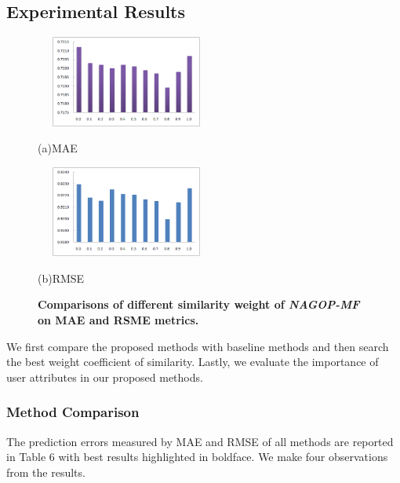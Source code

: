 \documentclass{llncs}
\begin{document}
	\subsection{Experimental Results}
	\begin{figure}
		\centering
		\begin{minipage}{0.48\linewidth}
			\centerline{\includegraphics[height=3cm, width=6cm]{XITAMAE.eps}}
			\centerline{(a)MAE}
		\end{minipage}
		\hfill
		\begin{minipage}{0.48\linewidth}
			\centerline{\includegraphics[height=3cm, width=6cm]{XITARSME.eps}}
			\centerline{(b)RMSE}
		\end{minipage}
		\caption{\textbf{Comparisons of different similarity weight of \emph{NAGOP-MF} on MAE and RSME metrics. }}
	\end{figure}
	We first compare the proposed methods with baseline methods
	and then search the best weight coefficient of similarity.
	Lastly, we evaluate the importance of user attributes in our proposed methods.
	\subsubsection{Method Comparison}
	The prediction errors measured by MAE and RMSE of all methods are reported in Table 6 with best results highlighted in boldface.
	We make four observations from the results.
	
\end{document}
